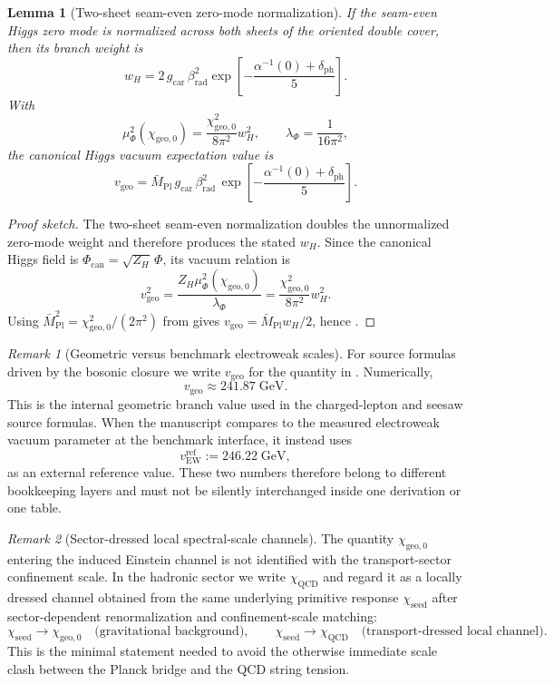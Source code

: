 \documentclass[11pt,a4paper]{article}
\newtheorem{lemma}[theorem]{Lemma}
\theoremstyle{definition}
\theoremstyle{remark}
\newtheorem*{remark}{Remark}
\newcommand{\Mpl}{\bar M_{\mathrm{Pl}}}
\newcommand{\QCD}{\mathrm{QCD}}
\newcommand{\gcar}{g_{\mathrm{car}}}
\newcommand{\chiseed}{\chi_{\mathrm{seed}}}
\newcommand{\chigeozero}{\chi_{\mathrm{geo},0}}
\newcommand{\vgeo}{v_{\mathrm{geo}}}
\newcommand{\vewref}{v_{\mathrm{EW}}^{\mathrm{ref}}}
\begin{document}
\begin{lemma}[Two-sheet seam-even zero-mode normalization]
\label{lem:two-sheet-zero-mode-normalization}
If the seam-even Higgs zero mode is normalized across both sheets of the oriented double cover, then its branch weight is
\[
w_H
=
2\,\gcar\,\beta_{\mathrm{rad}}^2
\exp\!\left[-\frac{\alpha^{-1}(0)+\delta_{\mathrm{ph}}}{5}\right].
\]
With
\[
\mu_\Phi^2(\chigeozero)=\frac{\chigeozero^2}{8\pi^2}w_H^2,
\qquad
\lambda_\Phi=\frac{1}{16\pi^2},
\]
the canonical Higgs vacuum expectation value is
\begin{equation}
\label{eq:carrier-dressed-v}
\vgeo
=
\Mpl\,\gcar\,\beta_{\mathrm{rad}}^2\,
\exp\!\left[-\frac{\alpha^{-1}(0)+\delta_{\mathrm{ph}}}{5}\right].
\end{equation}
\end{lemma}

\begin{proof}[Proof sketch]
The two-sheet seam-even normalization doubles the unnormalized zero-mode weight and therefore produces the stated $w_H$. Since the canonical Higgs field is $\Phi_{\mathrm{can}}=\sqrt{Z_H}\,\Phi$, its vacuum relation is
\[
\vgeo^2=\frac{Z_H\mu_\Phi^2(\chigeozero)}{\lambda_\Phi}
=
\frac{\chigeozero^2}{8\pi^2}w_H^2.
\]
Using $\Mpl^2=\chigeozero^2/(2\pi^2)$ from  gives $\vgeo=\Mpl w_H/2$, hence .
\end{proof}

\begin{remark}[Geometric versus benchmark electroweak scales]
For source formulas driven by the bosonic closure we write $\vgeo$ for the quantity in . Numerically,
\[
\vgeo\approx\num{241.87}\;\mathrm{GeV}.
\]
This is the internal geometric branch value used in the charged-lepton and seesaw source formulas. When the manuscript compares to the measured electroweak vacuum parameter at the benchmark interface, it instead uses
\[
\vewref:=\num{246.22}\;\mathrm{GeV},
\]
as an external reference value. These two numbers therefore belong to different bookkeeping layers and must not be silently interchanged inside one derivation or one table.
\end{remark}

\begin{remark}[Sector-dressed local spectral-scale channels]
The quantity $\chigeozero$ entering the induced Einstein channel is not identified with the transport-sector confinement scale. In the hadronic sector we write $\chi_{\QCD}$ and regard it as a locally dressed channel obtained from the same underlying primitive response $\chiseed$ after sector-dependent renormalization and confinement-scale matching:
\[
\chiseed \longrightarrow \chigeozero \quad \text{(gravitational background)},
\qquad
\chiseed \longrightarrow \chi_{\QCD} \quad \text{(transport-dressed local channel)}.
\]
This is the minimal statement needed to avoid the otherwise immediate scale clash between the Planck bridge and the QCD string tension.
\end{remark}
\end{document}
